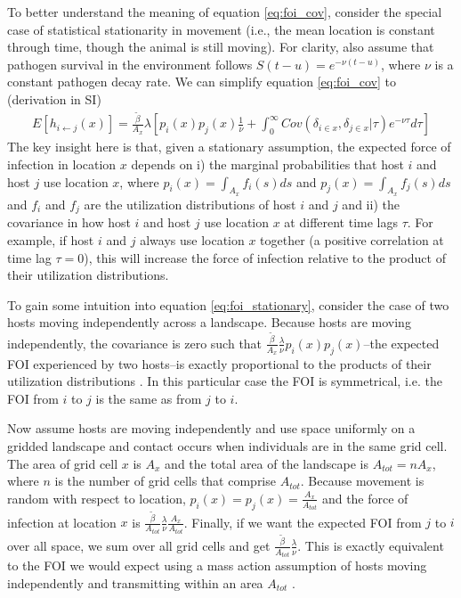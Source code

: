 \documentclass[letterpaper]{article}
\begin{document}
To better understand the meaning of equation \ref{eq:foi_cov}, consider the special case of statistical stationarity in movement (i.e., the mean location is constant through time, though the animal is still moving).  
For clarity, also assume that pathogen survival in the environment follows $S(t - u) = e^{-\nu (t - u)}$, where $\nu$ is a constant pathogen decay rate.  We  can simplify equation \ref{eq:foi_cov} to (derivation in SI)
\begin{equation}
    \begin{aligned}
    E[h_{i \leftarrow j}(x)] = \frac{\tilde{\beta}}{A_x} \lambda \left[p_i(x)p_j(x) \frac{1}{\nu} + \int_{0}^{\infty} Cov(\delta_{i \in x}, \delta_{j \in x} | \tau) e^{-\nu \tau} d\tau\right]
    \end{aligned}
    \label{eq:foi_stationary}
\end{equation}
The key insight here is that, given a stationary assumption, the expected force of infection in location $x$ depends on i) the marginal probabilities that host $i$ and host $j$ use location $x$, where $p_i(x) = \int_{A_x} f_i(s) ds$ and $p_j(x) = \int_{A_x} f_j(s) ds$ and $f_i$ and $f_j$ are the utilization distributions of host $i$ and $j$ and ii) the covariance in how host $i$ and host $j$ use location $x$ at different time lags $\tau$. 
For example, if host $i$ and $j$ always use location $x$ together (a positive correlation at time lag $\tau = 0$), this will increase the force of infection relative to the product of their utilization distributions.  

To gain some intuition into equation \ref{eq:foi_stationary}, consider the case of two hosts moving independently across a landscape. 
Because hosts are moving independently, the covariance is zero such that $\frac{\tilde{\beta}}{A_x} \frac{\lambda}{\nu} p_i(x)p_j(x)$--the expected FOI experienced by two hosts--is exactly proportional to the products of their utilization distributions \citep[similar to the result given in][]{Noonan2021}.  In this particular case the FOI is symmetrical, i.e. the FOI from $i$ to $j$ is the same as from $j$ to $i$.

Now assume hosts are moving independently and use space uniformly on a gridded landscape and contact occurs when individuals are in the same grid cell.  The area of grid cell $x$ is $A_x$ and the total area of the landscape is $A_{tot} = n A_x$, where $n$ is the number of grid cells that comprise $A_{tot}$. Because movement is random with respect to location, $p_i(x) = p_j(x) = \frac{A_x}{A_{tot}}$ and the force of infection at location $x$ is $\frac{\tilde{\beta}}{A_{tot}} \frac{\lambda}{\nu} \frac{A_x}{A_{tot}}$.  Finally, if we want the expected FOI from $j$ to $i$ over all space, we sum over all grid cells and get $\frac{\tilde{\beta}}{A_{tot}} \frac{\lambda}{\nu}$. This is exactly equivalent to the FOI we would expect using a mass action assumption of hosts moving independently and transmitting within an area $A_{tot}$ \citep{McCallum2001}.
\end{document}
